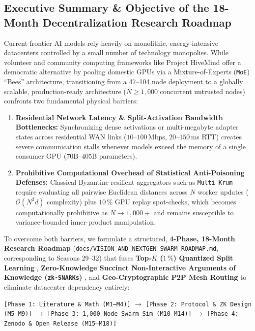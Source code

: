\documentclass[11pt,a4paper]{article}
\begin{document}
\subsection{Executive Summary \& Objective of the 18-Month Decentralization Research Roadmap}
\label{sec:roadmap_exec_summary}

Current frontier AI models rely heavily on monolithic, energy-intensive datacenters controlled by a small number of technology monopolies. While volunteer and community computing frameworks like Project HiveMind offer a democratic alternative by pooling domestic GPUs via a Mixture-of-Experts (\texttt{MoE}) ``Bees'' architecture, transitioning from a 47--104 node deployment to a globally scalable, production-ready architecture ($N \ge 1{,}000$ concurrent untrusted nodes) confronts two fundamental physical barriers:
\begin{enumerate}[leftmargin=1.8em]
    \item \textbf{Residential Network Latency \& Split-Activation Bandwidth Bottlenecks:} Synchronizing dense activations or multi-megabyte adapter states across residential WAN links ($10\text{--}100$\,Mbps, $20\text{--}150$\,ms RTT) creates severe communication stalls whenever models exceed the memory of a single consumer GPU ($70\text{B}\text{--}405\text{B}$ parameters).
    \item \textbf{Prohibitive Computational Overhead of Statistical Anti-Poisoning Defenses:} Classical Byzantine-resilient aggregators such as \texttt{Multi-Krum} \cite{blanchard2017krum} require evaluating all pairwise Euclidean distances across $N$ worker updates ($\mathcal{O}(N^2 d)$ complexity) plus $10\,\%$ GPU replay spot-checks, which becomes computationally prohibitive as $N \to 1{,}000+$ and remains susceptible to variance-bounded inner-product manipulation.
\end{enumerate}

To overcome both barriers, we formulate a structured, \textbf{4-Phase, 18-Month Research Roadmap} (\texttt{docs/\allowbreak VISION\_\allowbreak AND\_\allowbreak NEXTGEN\_\allowbreak SWARM\_\allowbreak ROADMAP.md}, corresponding to Seasons 29--32) that fuses \textbf{Top-$K$ ($1\,\%$) Quantized Split Learning} \cite{gupta2018splitlearning}, \textbf{Zero-Knowledge Succinct Non-Interactive Arguments of Knowledge (\texttt{zk-SNARKs})} \cite{groth2016size}, and \textbf{Geo-Cryptographic P2P Mesh Routing} to eliminate datacenter dependency entirely:
\begin{center}
\footnotesize
\texttt{[Phase 1: Literature \& Math (M1--M4)]} $\longrightarrow$ \texttt{[Phase 2: Protocol \& ZK Design (M5--M9)]} $\longrightarrow$ \texttt{[Phase 3: 1,000-Node Swarm Sim (M10--M14)]} $\longrightarrow$ \texttt{[Phase 4: Zenodo \& Open Release (M15--M18)]}
\end{center}
\end{document}
